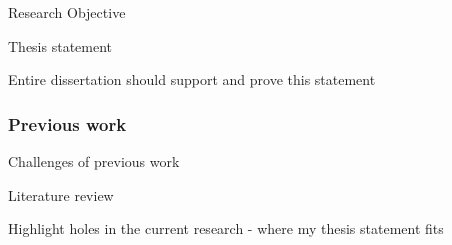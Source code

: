 
\begin{frame}[t]{Research Objective}
    
    Thesis statement

    Entire dissertation should support and prove this statement

\end{frame}

\begin{frame}[t]\frametitle{Previous work}
    
    Challenges of previous work

    Literature review

    Highlight holes in the current research - where my thesis statement fits

\end{frame}
